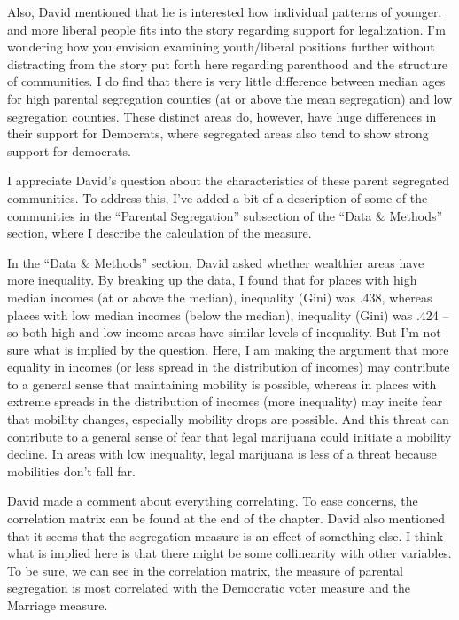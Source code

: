 \documentclass[12pt,stdletter,dateno,sigleft]{newlfm} %
\begin{document}
\begin{newlfm}
Also, David mentioned that he is interested how individual patterns of younger, and more liberal people fits into the story regarding support for legalization. I'm wondering how you envision examining youth/liberal positions further without distracting from the story put forth here regarding parenthood and the structure of communities. I do find that there is very little difference between median ages for high parental segregation counties (at or above the mean segregation) and low segregation counties. These distinct areas do, however, have huge differences in their support for Democrats, where segregated areas also tend to show strong support for democrats.

I appreciate David's question about the characteristics of these parent segregated communities. To address this, I've added a bit of a description of some of the communities in the ``Parental Segregation'' subsection of the ``Data \& Methods'' section, where I describe the calculation of the measure. 

In the ``Data \& Methods'' section, David asked whether wealthier areas have more inequality. By breaking up the data, I found that for places with high median incomes (at or above the median), inequality (Gini) was .438, whereas places with low median incomes (below the median), inequality (Gini) was .424 -- so both high and low income areas have similar levels of inequality. But I'm not sure what is implied by the question. Here, I am making the argument that more equality in incomes (or less spread in the distribution of incomes) may contribute to a general sense that maintaining mobility is possible, whereas in places with extreme spreads in the distribution of incomes (more inequality) may incite fear that mobility changes, especially mobility drops are possible. And this threat can contribute to a general sense of fear that legal marijuana could initiate a mobility decline. In areas with low inequality, legal marijuana is less of a threat because mobilities don't fall far. 

David made a comment about everything correlating. To ease concerns, the correlation matrix can be found at the end of the chapter. David also mentioned that it seems that the segregation measure is an effect of something else. I think what is implied here is that there might be some collinearity with other variables. To be sure, we can see in the correlation matrix, the measure of parental segregation is most correlated with the Democratic voter measure and the Marriage measure. 


\end{newlfm}
\end{document}
